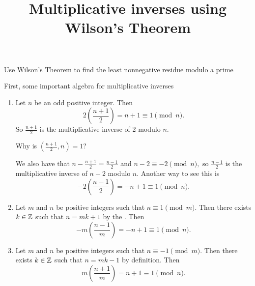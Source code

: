 \documentclass{ximera}
\title{Multiplicative inverses using Wilson's Theorem}
\begin{document}
\begin{abstract}
\end{abstract}
\maketitle


\begin{obj}
\item Use Wilson's Theorem to find the least nonnegative residue modulo a prime
\end{obj}




First, some important algebra  for multiplicative inverses
\begin{example}
  \begin{enumerate}
    \item  Let $n$ be an odd positive integer. Then \[2\left(\frac{n+1}{2}\right)=n+1\equiv 1\pmod{n}.\] So $\frac{n+1}{2}$ is the multiplicative inverse of $2$ modulo $n$. 
    \begin{tps}
      Why is $\left(\frac{n+1}{2},n\right)=1$?
    \end{tps}

    We also have that $n-\frac{n+1}{2}= \frac{n-1}{2}$ and $n-2\equiv -2\pmod{n},$ so $\frac{n-1}{2}$ is the multiplicative inverse of $n-2$ modulo $n.$ Another way to see this is 
    \[-2\left(\frac{n-1}{2}\right)=-n+1\equiv 1\pmod{n}.\] 

    \item Let $m$ and $n$ be positive integers such that $n\equiv 1\pmod m.$ Then there exists $k\in\mathbb Z$ such that $n=mk+1$ by the . Then 
    \[-m\left(\frac{n-1}{m}\right)=-n+1\equiv 1\pmod{n}.\]

    \item Let $m$ and $n$ be positive integers such that $n\equiv -1\pmod m.$ Then there exists $k\in\mathbb Z$ such that $n=mk-1$ by definition. Then 
    \[m\left(\frac{n+1}{m}\right)=n+1\equiv 1\pmod{n}.\]
  \end{enumerate}

\end{example}
\end{document}
